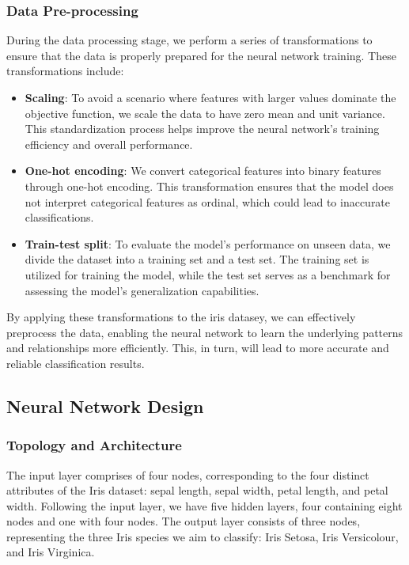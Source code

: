 \documentclass[conference]{inc/IEEEtran}
\begin{document}
\subsubsection{Data Pre-processing}
During the data processing stage, we perform a series of transformations to ensure that the data is properly prepared
for the neural network training. These transformations include:
\begin{itemize}
    \item \textbf{Scaling}: To avoid a scenario where features with larger values dominate the objective function, we scale the data to
    have zero mean and unit variance. This standardization process helps improve the neural network's training efficiency and
    overall performance.
    
    \item \textbf{One-hot encoding}: We convert categorical features into binary features through one-hot encoding. This transformation
    ensures that the model does not interpret categorical features as ordinal, which could lead to inaccurate classifications.
    
    \item \textbf{Train-test split}: To evaluate the model's performance on unseen data, we divide the dataset into a training set and a
    test set. The training set is utilized for training the model, while the test set serves as a benchmark for assessing the
    model's generalization capabilities.
\end{itemize}

By applying these transformations to the iris datasey, we can effectively preprocess the data, enabling the neural
network to learn the underlying patterns and relationships more efficiently. This, in turn, will lead to more accurate and
reliable classification results.
\subsection{Neural Network Design}
\subsubsection{Topology and Architecture}

The input layer comprises of four nodes, corresponding to the four distinct attributes of the Iris dataset: sepal length, sepal width,
petal length, and petal width. Following the input layer, we have five hidden layers, four containing eight nodes and one with four nodes.
The output layer consists of three nodes, representing the three Iris species we aim to classify: Iris Setosa, Iris Versicolour, and Iris Virginica.
\end{document}
